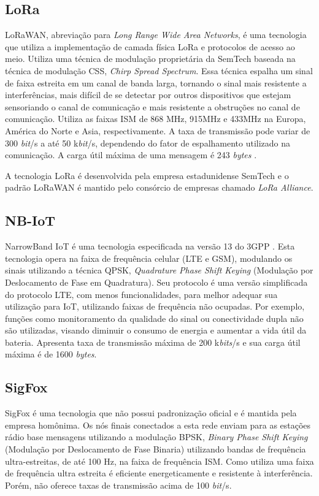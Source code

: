 \subsection{LoRa}
LoRaWAN, abreviação para \emph{Long Range Wide Area Networks}, é uma tecnologia que utiliza a implementação de camada física LoRa e protocolos de acesso ao meio. Utiliza uma técnica de modulação proprietária da SemTech baseada na técnica de modulação CSS, \emph{Chirp Spread Spectrum}. Essa técnica espalha um sinal de faixa estreita em um canal de banda larga, tornando o sinal mais resistente a interferências, mais difícil de se detectar por outros dispositivos que estejam sensoriando o canal de comunicação e mais resistente a obstruções no canal de comunicação. Utiliza as faixas ISM de 868 MHz, 915MHz e 433MHz na Europa, América do Norte e Asia, respectivamente. A taxa de transmissão pode variar de 300 \emph{bit}/s a até 50 k\emph{bit}/s, dependendo do fator de espalhamento utilizado na comunicação. A carga útil máxima de uma mensagem é 243 \emph{bytes} \cite{mekki2019comparative}.

A tecnologia LoRa é desenvolvida pela empresa estadunidense SemTech e o padrão LoRaWAN é mantido pelo consórcio de empresas chamado \emph{LoRa Alliance}.

\subsection{NB-IoT}
NarrowBand IoT é uma tecnologia especificada na versão 13 do 3GPP \cite{nbIoT}. Esta tecnologia opera na faixa de frequência celular (LTE e GSM), modulando os sinais utilizando a técnica QPSK, \emph{Quadrature Phase Shift Keying} (Modulação por Deslocamento de Fase em Quadratura). Seu protocolo é uma versão simplificada do protocolo LTE, com menos funcionalidades, para melhor adequar sua utilização para IoT, utilizando faixas de frequência não ocupadas. Por exemplo, funções como monitoramento da qualidade do sinal ou conectividade dupla não são utilizadas, visando diminuir o consumo de energia e aumentar a vida útil da bateria. Apresenta taxa de transmissão máxima de 200 k\emph{bits}/s e sua carga útil máxima é de 1600 \emph{bytes}.

\subsection{SigFox}
SigFox é uma tecnologia que não possui padronização oficial e é mantida pela empresa homônima. Os nós finais conectados a esta rede enviam para as estações rádio base mensagens utilizando a modulação BPSK, \emph{Binary Phase Shift Keying} (Modulação por Deslocamento de Fase Binaria) utilizando bandas de frequência ultra-estreitas, de até 100 Hz, na faixa de frequência ISM. Como utiliza uma faixa de frequência ultra estreita é eficiente energeticamente e resistente à interferência. Porém, não oferece taxas de transmissão acima de 100 \emph{bit}/s.

